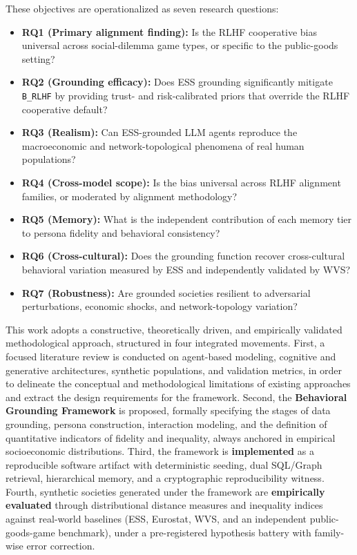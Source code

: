 These objectives are operationalized as seven research questions:

\begin{itemize}
\item \textbf{RQ1 (Primary alignment finding):} Is the RLHF cooperative bias universal across social-dilemma game types, or specific to the public-goods setting?
\item \textbf{RQ2 (Grounding efficacy):} Does ESS grounding significantly mitigate \texttt{B\_RLHF} by providing trust- and risk-calibrated priors that override the RLHF cooperative default?
\item \textbf{RQ3 (Realism):} Can ESS-grounded LLM agents reproduce the macroeconomic and network-topological phenomena of real human populations?
\item \textbf{RQ4 (Cross-model scope):} Is the bias universal across RLHF alignment families, or moderated by alignment methodology?
\item \textbf{RQ5 (Memory):} What is the independent contribution of each memory tier to persona fidelity and behavioral consistency?
\item \textbf{RQ6 (Cross-cultural):} Does the grounding function recover cross-cultural behavioral variation measured by ESS and independently validated by WVS?
\item \textbf{RQ7 (Robustness):} Are grounded societies resilient to adversarial perturbations, economic shocks, and network-topology variation?
\end{itemize}


This work adopts a constructive, theoretically driven, and empirically validated methodological approach, structured in four integrated movements. First, a focused literature review is conducted on agent-based modeling, cognitive and generative architectures, synthetic populations, and validation metrics, in order to delineate the conceptual and methodological limitations of existing approaches and extract the design requirements for the framework. Second, the \textbf{Behavioral Grounding Framework} is proposed, formally specifying the stages of data grounding, persona construction, interaction modeling, and the definition of quantitative indicators of fidelity and inequality, always anchored in empirical socioeconomic distributions. Third, the framework is \textbf{implemented} as a reproducible software artifact with deterministic seeding, dual SQL/Graph retrieval, hierarchical memory, and a cryptographic reproducibility witness. Fourth, synthetic societies generated under the framework are \textbf{empirically evaluated} through distributional distance measures and inequality indices against real-world baselines (ESS, Eurostat, WVS, and an independent public-goods-game benchmark), under a pre-registered hypothesis battery with family-wise error correction.


